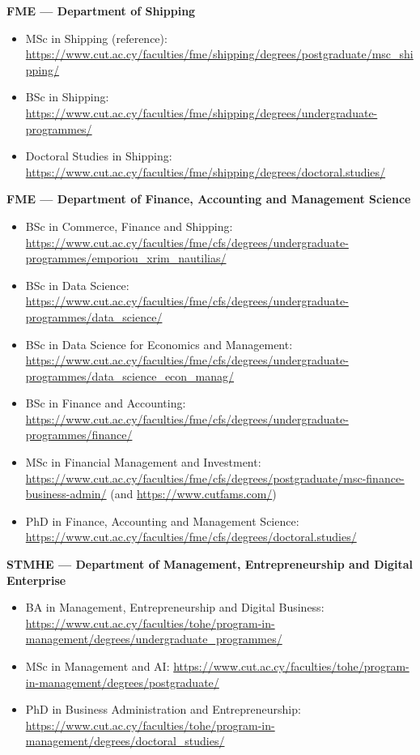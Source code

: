 \documentclass[11pt,a4paper]{article}
\begin{document}
\textbf{FME --- Department of Shipping}
\begin{itemize}
  \item MSc in Shipping (reference): \url{https://www.cut.ac.cy/faculties/fme/shipping/degrees/postgraduate/msc_shipping/}
  \item BSc in Shipping: \url{https://www.cut.ac.cy/faculties/fme/shipping/degrees/undergraduate-programmes/}
  \item Doctoral Studies in Shipping: \url{https://www.cut.ac.cy/faculties/fme/shipping/degrees/doctoral.studies/}
\end{itemize}

\textbf{FME --- Department of Finance, Accounting and Management Science}
\begin{itemize}
  \item BSc in Commerce, Finance and Shipping: \url{https://www.cut.ac.cy/faculties/fme/cfs/degrees/undergraduate-programmes/emporiou_xrim_nautilias/}
  \item BSc in Data Science: \url{https://www.cut.ac.cy/faculties/fme/cfs/degrees/undergraduate-programmes/data_science/}
  \item BSc in Data Science for Economics and Management: \url{https://www.cut.ac.cy/faculties/fme/cfs/degrees/undergraduate-programmes/data_science_econ_manag/}
  \item BSc in Finance and Accounting: \url{https://www.cut.ac.cy/faculties/fme/cfs/degrees/undergraduate-programmes/finance/}
  \item MSc in Financial Management and Investment: \url{https://www.cut.ac.cy/faculties/fme/cfs/degrees/postgraduate/msc-finance-business-admin/} (and \url{https://www.cutfams.com/})
  \item PhD in Finance, Accounting and Management Science: \url{https://www.cut.ac.cy/faculties/fme/cfs/degrees/doctoral.studies/}
\end{itemize}

\textbf{STMHE --- Department of Management, Entrepreneurship and Digital Enterprise}
\begin{itemize}
  \item BA in Management, Entrepreneurship and Digital Business: \url{https://www.cut.ac.cy/faculties/tohe/program-in-management/degrees/undergraduate_programmes/}
  \item MSc in Management and AI: \url{https://www.cut.ac.cy/faculties/tohe/program-in-management/degrees/postgraduate/}
  \item PhD in Business Administration and Entrepreneurship: \url{https://www.cut.ac.cy/faculties/tohe/program-in-management/degrees/doctoral_studies/}
\end{itemize}
\end{document}

